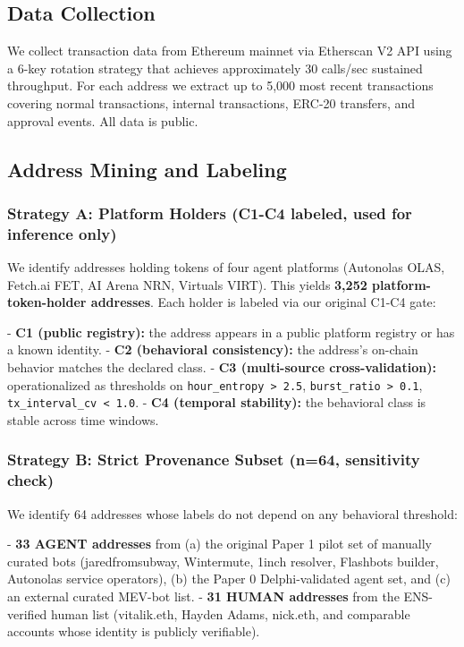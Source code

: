 \documentclass[sigconf,nonacm=false]{acmart}
\begin{document}
\subsection{Data Collection}

We collect transaction data from Ethereum mainnet via Etherscan V2 API using a 6-key rotation strategy that achieves approximately 30 calls/sec sustained throughput. For each address we extract up to 5,000 most recent transactions covering normal transactions, internal transactions, ERC-20 transfers, and approval events. All data is public.

\subsection{Address Mining and Labeling}

\subsubsection{Strategy A: Platform Holders (C1-C4 labeled, \textbf{used for inference only})}

We identify addresses holding tokens of four agent platforms (Autonolas OLAS, Fetch.ai FET, AI Arena NRN, Virtuals VIRT). This yields \textbf{3,252 platform-token-holder addresses}. Each holder is labeled via our original C1-C4 gate:

- \textbf{C1 (public registry):} the address appears in a public platform registry or has a known identity.
- \textbf{C2 (behavioral consistency):} the address's on-chain behavior matches the declared class.
- \textbf{C3 (multi-source cross-validation):} operationalized as thresholds on \texttt{hour\_entropy > 2.5}, \texttt{burst\_ratio > 0.1}, \texttt{tx\_interval\_cv < 1.0}.
- \textbf{C4 (temporal stability):} the behavioral class is stable across time windows.

\subsubsection{Strategy B: Strict Provenance Subset (n=64, \textbf{sensitivity check})}

We identify 64 addresses whose labels do not depend on any behavioral threshold:

- \textbf{33 AGENT addresses} from (a) the original Paper 1 pilot set of manually curated bots (jaredfromsubway, Wintermute, 1inch resolver, Flashbots builder, Autonolas service operators), (b) the Paper 0 Delphi-validated agent set, and (c) an external curated MEV-bot list.
- \textbf{31 HUMAN addresses} from the ENS-verified human list (vitalik.eth, Hayden Adams, nick.eth, and comparable accounts whose identity is publicly verifiable).
\end{document}
